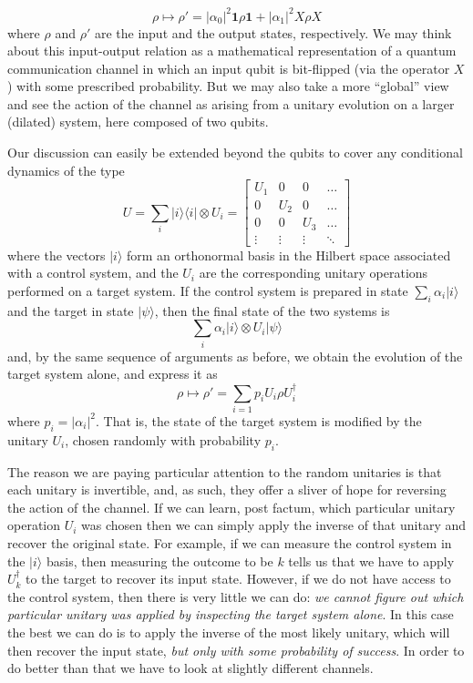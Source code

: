 \documentclass[fleqn]{article}
\begin{document}
\[
  \rho\longmapsto
  \rho'= |\alpha_0|^2 \mathbf{1}\rho\mathbf{1}+ |\alpha_1|^2 X\rho X
\]
where \(\rho\) and \(\rho'\) are the input and the output states, respectively.
We may think about this input-output relation as a mathematical representation of a quantum communication channel in which an input qubit is bit-flipped (via the operator \(X\)) with some prescribed probability.
But we may also take a more ``global'' view and see the action of the channel as arising from a unitary evolution on a larger (dilated) system, here composed of two qubits.

Our discussion can easily be extended beyond the qubits to cover any conditional dynamics of the type
\[
  U
  = \sum_i |i\rangle\langle i|\otimes U_i
  = \begin{bmatrix}
    U_1 & 0 & 0 & \ldots
  \\0 & U_2 & 0 & \ldots
  \\0 & 0 & U_3 & \ldots
  \\\vdots & \vdots &\vdots & \ddots
  \end{bmatrix}
\]
where the vectors \(|i\rangle\) form an orthonormal basis in the Hilbert space associated with a control system, and the \(U_i\) are the corresponding unitary operations performed on a target system.
If the control system is prepared in state \(\sum_i\alpha_i|i\rangle\) and the target in state \(|\psi\rangle\), then the final state of the two systems is
\[
  \sum_i \alpha_i|i\rangle\otimes U_i|\psi\rangle
\]
and, by the same sequence of arguments as before, we obtain the evolution of the target system alone, and express it as
\[
  \rho\longmapsto
  \rho' = \sum_{i=1} p_i U_i \rho U^\dagger_i
\]
where \(p_i=|\alpha_i|^2\).
That is, the state of the target system is modified by the unitary \(U_i\), chosen randomly with probability \(p_i\).

The reason we are paying particular attention to the random unitaries is that each unitary is invertible, and, as such, they offer a sliver of hope for reversing the action of the channel.
If we can learn, post factum, which particular unitary operation \(U_i\) was chosen then we can simply apply the inverse of that unitary and recover the original state.
For example, if we can measure the control system in the \(|i\rangle\) basis, then measuring the outcome to be \(k\) tells us that we have to apply \(U_k^\dagger\) to the target to recover its input state.
However, if we do not have access to the control system, then there is very little we can do: \emph{we cannot figure out which particular unitary was applied by inspecting the target system alone}.
In this case the best we can do is to apply the inverse of the most likely unitary, which will then recover the input state, \emph{but only with some probability of success}.
In order to do better than that we have to look at slightly different channels.
\end{document}
